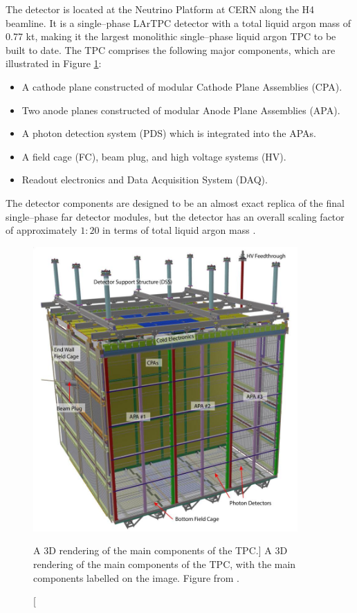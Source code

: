 The \protodune{} detector is located at the Neutrino Platform at CERN along the
H4 beamline. It is a single--phase LArTPC detector with a total liquid argon 
mass of 0.77 kt, making it the largest monolithic single--phase liquid argon TPC
to be built to date. The TPC comprises the following major components, which 
are illustrated in Figure \ref{fig:pdsp_tpc}:
\begin{itemize}
	\item A cathode plane constructed of modular Cathode Plane Assemblies (CPA).
	\item Two anode planes constructed of modular Anode Plane Assemblies (APA).
	\item A photon detection system (PDS) which is integrated into the APAs.
	\item A field cage (FC), beam plug, and high voltage systems (HV).
	\item Readout electronics and Data Acquisition System (DAQ).
\end{itemize}
The detector components are designed to be an almost exact replica of the final 
single--phase far detector modules, but the detector has an overall scaling 
factor of approximately $1:20$ in terms of total liquid argon mass 
\cite{Abi2017}.

\begin{figure}

	\centering

	\includegraphics[width=0.9\textwidth]{figures/pdsp_tpc.jpg}

	\caption
	[A 3D rendering of the main components of the \protodune{} TPC.]
	{A 3D rendering of the main components of the \protodune{} TPC, with the main
	components labelled on the image. Figure from 
	\cite{Abi2017}.}

	\label{fig:pdsp_tpc}

\end{figure}

